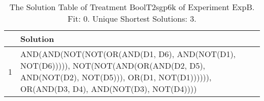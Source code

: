 \begin{table}[ht]
\centering
\begin{tabular}{rp{9cm}}
  \hline
 & Solution \\ 
  \hline
1 & AND(AND(NOT(NOT(OR(AND(D1, D6), AND(NOT(D1), NOT(D6))))), NOT(NOT(AND(OR(AND(D2, D5), AND(NOT(D2), NOT(D5))), OR(D1, NOT(D1)))))), OR(AND(D3, D4), AND(NOT(D3), NOT(D4)))) \\ 
   \hline
\end{tabular}
\caption{The Solution Table of Treatment BoolT2sgp6k of Experiment ExpB. Fit: 0. Unique Shortest Solutions: 3.} 
\end{table}
